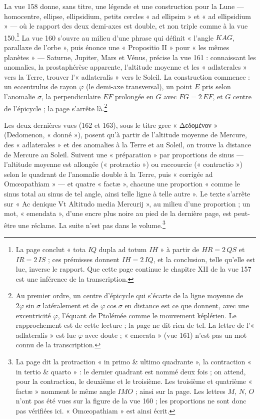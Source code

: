 \documentclass[11pt,a4paper]{article}
\begin{document}
La vue 158 donne, sans titre, une légende et une construction pour la Lune —
homocentre, ellipse, ellipsidium, petits cercles « ad ellipsim » et « ad
ellipsidium » — où le rapport des deux demi-axes est double, et non triple comme
à la vue 150.\footnote{La page conclut « tota $IQ$ dupla ad totum $IH$ » à partir de
$HR = 2\,QS$ et $IR = 2\,IS$ ; ces prémisses donnent $IH = 2\,IQ$, et la conclusion,
telle qu'elle est lue, inverse le rapport. Que cette page continue le chapitre XII
de la vue 157 est une inférence de la transcription.} La vue 160 s'ouvre au
milieu d'une phrase qui définit « l'angle $KAG$, parallaxe de l'orbe », puis
énonce une « Propositio II » pour « les mêmes planètes » — Saturne, Jupiter, Mars
et Vénus, précise la vue 161 : connaissant les anomalies, la prostaphérèse
apparente, l'altitude moyenne et les « adlaterales » vers la Terre, trouver
l'« adlateralis » vers le Soleil. La construction commence : un eccentrulus de
rayon $\varphi$ (le demi-axe transversal), un point $E$ pris selon l'anomalie
$\sigma$, la perpendiculaire $EF$ prolongée en $G$ avec $FG = 2\,EF$, et $G$ centre
de l'épicycle ; la page s'arrête là.\footnote{Au premier ordre, un centre
d'épicycle qui s'écarte de la ligne moyenne de $2\varphi\sin\sigma$ latéralement et
de $\varphi\cos\sigma$ en distance est ce que donnent, avec une excentricité
$\varphi$, l'équant de Ptolémée comme le mouvement képlérien. Le rapprochement est de
cette lecture ; la page ne dit rien de tel. La lettre de l'« adlateralis » est lue
$\varphi$ avec doute ; « emecata » (vue 161) n'est pas un mot connu de la
transcription.}

Les deux dernières vues (162 et 163), sous le titre grec « Δεδομένον » (Dedomenon, « donné »),
posent qu'à partir de l'altitude moyenne de Mercure, des « adlaterales » et des
anomalies à la Terre et au Soleil, on trouve la distance de Mercure au Soleil.
Suivent une « préparation » par proportions de sinus — l'altitude moyenne est
allongée (« protractio ») ou raccourcie (« contractio ») selon le quadrant de
l'anomalie double à la Terre, puis « corrigée ad Omœopathiam » — et quatre
« factæ », chacune une proportion « comme le sinus total au sinus de tel angle,
ainsi telle ligne à telle autre ». Le texte s'arrête sur « Ac denique Vt Altitudo
media Mercurij », au milieu d'une proportion ; un mot, « emendata », d'une encre
plus noire au pied de la dernière page, est peut-être une réclame. La suite n'est
pas dans le volume.\footnote{La page dit la protraction « in primo \& ultimo
quadrante », la contraction « in tertio \& quarto » : le dernier quadrant est
nommé deux fois ; on attend, pour la contraction, le deuxième et le troisième.
Les troisième et quatrième « factæ » nomment le même angle $IMO$ ; ainsi sur la
page. Les lettres $M$, $N$, $O$ n'ont pas été vues sur la figure de la vue 160 ; les
proportions ne sont donc pas vérifiées ici. « Omœopathiam » est ainsi écrit.}
\end{document}
